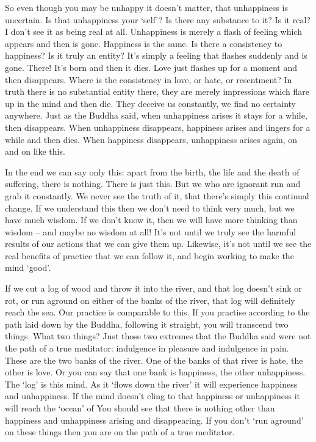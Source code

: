 So even though you may be unhappy it doesn't matter, that unhappiness is uncertain. Is that unhappiness your `self'? Is there any substance to it? Is it real? I don't see it as being real at all. Unhappiness is merely a flash of feeling which appears and then is gone. Happiness is the same. Is there a consistency to happiness? Is it truly an entity? It's simply a feeling that flashes suddenly and is gone. There! It's born and then it dies. Love just flashes up for a moment and then disappears. Where is the consistency in love, or hate, or resentment? In truth there is no substantial entity there, they are merely impressions which flare up in the mind and then die. They deceive us constantly, we find no certainty anywhere. Just as the Buddha said, when unhappiness arises it stays for a while, then disappears. When unhappiness disappears, happiness arises and lingers for a while and then dies. When happiness disappears, unhappiness arises again, on and on like this.

In the end we can say only this: apart from the birth, the life and the death of suffering, there is nothing. There is just this. But we who are ignorant run and grab it constantly. We never see the truth of it, that there's simply this continual change. If we understand this then we don't need to think very much, but we have much wisdom. If we don't know it, then we will have more thinking than wisdom -- and maybe no wisdom at all! It's not until we truly see the harmful results of our actions that we can give them up. Likewise, it's not until we see the real benefits of practice that we can follow it, and begin working to make the mind `good'.

If we cut a log of wood and throw it into the river, and that log doesn't sink or rot, or run aground on either of the banks of the river, that log will definitely reach the sea. Our practice is comparable to this. If you practise according to the path laid down by the Buddha, following it straight, you will transcend two things. What two things? Just those two extremes that the Buddha said were not the path of a true meditator: indulgence in pleasure and indulgence in pain. These are the two banks of the river. One of the banks of that river is hate, the other is love. Or you can say that one bank is happiness, the other unhappiness. The `log' is this mind. As it `flows down the river' it will experience happiness and unhappiness. If the mind doesn't cling to that happiness or unhappiness it will reach the `ocean' of  You should see that there is nothing other than happiness and unhappiness arising and disappearing. If you don't `run aground' on these things then you are on the path of a true meditator.

